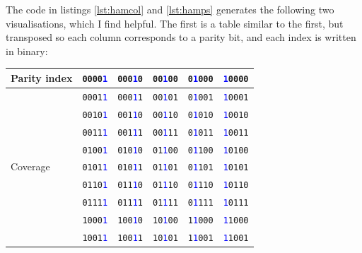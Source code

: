 \documentclass{article}
\begin{document}
    The code in listings \ref{lst:hamcol} and \ref{lst:hamps} generates the
    following two visualisations, which I find helpful. The first is a table
    similar to the first, but transposed so each column corresponds to a parity
    bit, and each index is written in binary:

\begin{center}
    \begin{tabular}{l|rrrrr}
    \toprule
    Parity index & \texttt{0000\textcolor{blue}{1}} & \texttt{000\textcolor{blue}{1}0} & \texttt{00\textcolor{blue}{1}00} & \texttt{0\textcolor{blue}{1}000} & \texttt{\textcolor{blue}{1}0000} \\
    \midrule
    \multirow{14}{*}{Coverage} & \texttt{0001\textcolor{blue}{1}} & \texttt{000\textcolor{blue}{1}1} & \texttt{00\textcolor{blue}{1}01} & \texttt{0\textcolor{blue}{1}001} & \texttt{\textcolor{blue}{1}0001} \\
    & \texttt{0010\textcolor{blue}{1}} & \texttt{001\textcolor{blue}{1}0} & \texttt{00\textcolor{blue}{1}10} & \texttt{0\textcolor{blue}{1}010} & \texttt{\textcolor{blue}{1}0010} \\
    & \texttt{0011\textcolor{blue}{1}} & \texttt{001\textcolor{blue}{1}1} & \texttt{00\textcolor{blue}{1}11} & \texttt{0\textcolor{blue}{1}011} & \texttt{\textcolor{blue}{1}0011} \\
    & \texttt{0100\textcolor{blue}{1}} & \texttt{010\textcolor{blue}{1}0} & \texttt{01\textcolor{blue}{1}00} & \texttt{0\textcolor{blue}{1}100} & \texttt{\textcolor{blue}{1}0100} \\
    & \texttt{0101\textcolor{blue}{1}} & \texttt{010\textcolor{blue}{1}1} & \texttt{01\textcolor{blue}{1}01} & \texttt{0\textcolor{blue}{1}101} & \texttt{\textcolor{blue}{1}0101} \\
    & \texttt{0110\textcolor{blue}{1}} & \texttt{011\textcolor{blue}{1}0} & \texttt{01\textcolor{blue}{1}10} & \texttt{0\textcolor{blue}{1}110} & \texttt{\textcolor{blue}{1}0110} \\
    & \texttt{0111\textcolor{blue}{1}} & \texttt{011\textcolor{blue}{1}1} & \texttt{01\textcolor{blue}{1}11} & \texttt{0\textcolor{blue}{1}111} & \texttt{\textcolor{blue}{1}0111} \\
    & \texttt{1000\textcolor{blue}{1}} & \texttt{100\textcolor{blue}{1}0} & \texttt{10\textcolor{blue}{1}00} & \texttt{1\textcolor{blue}{1}000} & \texttt{\textcolor{blue}{1}1000} \\
    & \texttt{1001\textcolor{blue}{1}} & \texttt{100\textcolor{blue}{1}1} & \texttt{10\textcolor{blue}{1}01} & \texttt{1\textcolor{blue}{1}001} & \texttt{\textcolor{blue}{1}1001} \\

\end{tabular}
\end{center}
\end{document}
